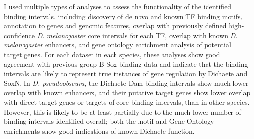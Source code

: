 I used multiple types of analyses to assess the functionality of the identified binding intervals, including discovery of de novo and known TF binding motifs, annotation to genes and genomic features, overlap with previously defined high-confidence \emph{D. melanogaster} core intervals for each TF, overlap with known \emph{D. melanogaster} enhancers, and gene ontology enrichment analysis of potential target genes. For each dataset in each species, these analyses show good agreement with previous group B Sox binding data and indicate that the binding intervals are likely to represent true instances of gene regulation by Dichaete and SoxN. In \emph{D. pseudoobscura}, the Dichaete-Dam binding intervals show much lower overlap with known enhancers, and their putative target genes show lower overlap with direct target genes or targets of core binding intervals, than in other species. However, this is likely to be at least partially due to the much lower number of binding intervals identified overall; both the motif and Gene Ontology enrichments show good indications of known Dichaete function.\\

